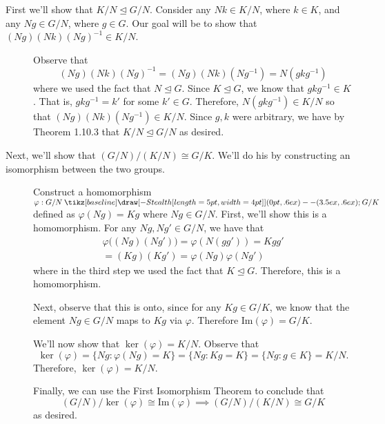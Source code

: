 \documentclass[12pt,letterpaper]{algebra_book}
\renewcommand{\to}{\mathbin{\tikz[baseline] \draw[-{Stealth[length=5pt,width=4pt]}] (0pt,.6ex) -- (3.5ex,.6ex);}}
\newcommand{\normal}{\unlhd}
\newcommand{\im}{\mbox{Im}}
\renewcommand{\phi}{\varphi}
\theoremstyle{definition}
\begin{document}
    \begin{prf}
        \textcolor{NavyBlue}{First we'll show that $K/N \normal G/N$. Consider any $Nk \in
        K/N$, where $k \in K$, and any $Ng \in G/N$, where $g \in G$.
        Our goal will be to show that $(Ng)(Nk)(Ng)^{-1} \in K/N$.}

        \begin{description}
            \item[\phantom{1}]
            \hspace{0.5cm} Observe that 
            \[
                (Ng)(Nk)(Ng)^{-1} = (Ng)(Nk)(Ng^{-1}) = N(gkg^{-1})
            \]  
            where we used the fact that $N \normal G$.  
            Since $K \normal G$, we know that $gkg^{-1} \in K$. That is,
            $gkg^{-1} = k'$ for some $k' \in G$. Therefore, $N(gkg^{-1})
            \in K/N$ so that $(Ng)(Nk)(Ng^{-1}) \in K/N$. Since $g, k$
            were arbitrary, we have by Theorem
            1.10.3 that $K/N \normal G/N$ as desired.
            
        \end{description}

        \textcolor{NavyBlue}{Next, we'll show that $(G/N)/(K/N) \cong
        G/K$. We'll do his by constructing an isomorphism between the
        two groups.}
        \begin{description}
            \item[\phantom{1}]
            \hspace{0.5cm}  Construct a
            homomorphism $\phi: G/N \to G/K$ defined as $\phi(Ng) = Kg$ where $Ng \in
            G/N$. First, we'll show this is a homomorphism. For any $Ng,
            Ng' \in G/N$, we have that 
            \begin{align*}
                \phi\big((Ng)(Ng')\big) = \phi(N(gg')) = Kgg' \\
                = (Kg)(Kg') = \phi(Ng)\phi(Ng')
            \end{align*}
            where in the third step we used the fact that $K \normal G$.
            Therefore, this is a homomorphism. 
    
            Next, observe that this is onto, since for any $Kg \in G/K$,
            we know that the element $Ng \in G/N$ maps to $Kg$ via $\phi$.
            Therefore $\im(\phi) = G/K.$
    
            We'll now show that $\ker(\phi) = K/N$. 
            Observe that 
            \[
                \ker(\phi) = \{Ng: \phi(Ng) = K\} = \{Ng: Kg = K\} = \{Ng: g \in K\} = K/N.
            \]
            Therefore, $\ker(\phi) = K/N$.
    
            Finally, we can use the First Isomorphism Theorem to conclude
            that 
            \[
                (G/N)/\ker(\phi) \cong \im(\phi) \implies (G/N)/(K/N) \cong G/K
            \]
            as desired.            
        \end{description}

    \end{prf}
\end{document}
